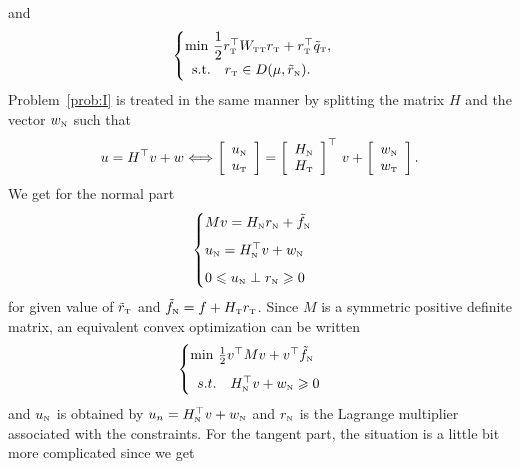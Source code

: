 and
\begin{equation}
  \label{eq:AO-4}
  \begin{cases}
    \min\,  \Frac 1 2 r_\t^\top W _{\t\t} r_\t +  r_\t^\top \tilde q_\t, \\
    \begin{array}{ll}
     \text{s.t.}  & r_\t \in D(\mu,\tilde r_{\n}).
  \end{array}
\end{cases}
\end{equation}
Problem~\ref{prob:I} is treated in the same manner by splitting the matrix $H$ and the vector $w_{\hbox{\tiny{N}}}$ such that
\begin{equation}
  \label{eq:H-split}
  u = H^\top v +w \Longleftrightarrow  \left[\begin{array}{c}
    u_\n \\ u_\t
  \end{array}\right]
 =
  \left[\begin{array}{c}
      H_{\n} \\
      H_{\t} \\    
    \end{array}\right]^\top   \, v+
 \left[\begin{array}{c}
    w_\n \\w_\t
  \end{array}\right].
\end{equation}
We get for the normal part
\begin{equation}\label{eq:soccp1-normal}
  \begin{cases}
    M v = {H_\n} {r_\n} + {\tilde f_\n} \\[2mm]
    u_\n = H_\n^\top v + w_\n \\[2mm]
    0 \leq { u_\n} \perp r _\n \geq 0
  \end{cases}
\end{equation}
for  given value of $\tilde r_{\hbox{\tiny{T}}}$ and $\tilde f_{\hbox{\tiny{N}}} = f + H_{\hbox{\tiny{T}}} r_{\hbox{\tiny{T}}}$. Since $M$ is a symmetric positive definite matrix, an equivalent convex optimization can be written
\begin{equation}
  \label{eq:soccp1-normal-min}
    \begin{cases}
    \min\, \frac 1 2 v^\top M v + v^\top \tilde f_\n  \\[2mm]
     \begin{array}{ll}
    s.t. & H_\n^\top v + w_\n \geq 0
  \end{array}
  \end{cases}
\end{equation}
and $u_{\hbox{\tiny{N}}}$ is obtained by $ u_n = H_{\hbox{\tiny{N}}}^\top v + w_{\hbox{\tiny{N}}} $ and $r_{\hbox{\tiny{N}}}$ is the Lagrange multiplier associated with the constraints. For the tangent part, the situation is a little bit more complicated since we get
